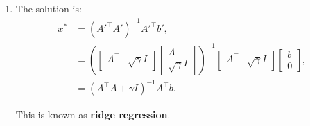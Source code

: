 \begin{example}
\begin{enumerate}
        \item The solution is:
        \begin{align*}
        x^* 
        &= (A'^\top A')^{-1} A'^\top b', \\
        &= \left(
        \begin{bmatrix}
        A^\top & \sqrt{\gamma} I
        \end{bmatrix}
        \begin{bmatrix}
        A \\ 
        \sqrt{\gamma} I
        \end{bmatrix}
        \right)^{-1}
        \begin{bmatrix}
        A^\top & \sqrt{\gamma} I
        \end{bmatrix}
        \begin{bmatrix}
        b \\ 
        0
        \end{bmatrix}, \\
        &= \left(A^\top A + \gamma I\right)^{-1} A^\top b.
        \end{align*}
        
        This is known as \textbf{ridge regression}.
    \end{enumerate}
\end{example}

